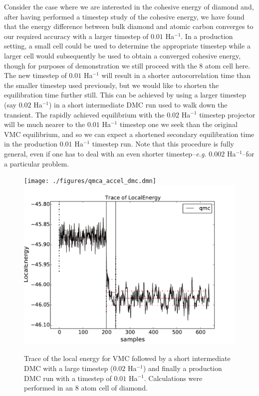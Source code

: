 Consider the case where we are interested in the cohesive energy of 
diamond and, after having performed a timestep study of the cohesive 
energy, we have found that the energy difference between bulk diamond 
and atomic carbon converges to our required accuracy with a larger 
timestep of $0.01$ Ha$^{-1}$.  In a production setting, a small cell 
could be used to determine  the appropriate timestep while a larger 
cell would subsequently be used to obtain a converged cohesive energy, 
though for purposes of demonstration we still proceed with the 8 atom 
cell here.  The new timestep of $0.01$ Ha$^{-1}$ will result in a shorter 
autocorrelation time than the smaller timestep used previously, but 
we would like to shorten the equilibration time further still.  This 
can be achieved by using a larger timestep (say $0.02$ Ha$^{-1}$) in a 
short intermediate DMC run used to walk down the transient.  The 
rapidly achieved equilibrium with the $0.02$ Ha$^{-1}$ timestep 
projector will be much nearer to the $0.01$ Ha$^{-1}$ timestep one 
we seek than the original VMC equilibrium, and so we can expect 
a shortened secondary equilibration time in the production 
$0.01$ Ha$^{-1}$ timestep run. Note that this procedure is fully 
general, even if one has to deal with an even shorter 
timestep--\emph{e.g.} $0.002$ Ha$^{-1}$--for a particular problem.

\begin{figure}
\begin{center}
\ifdefined\HCode  
\texttt{[image: ./figures/qmca\_accel\_dmc.dmn]}
\else
\includegraphics[trim = 0mm 0mm 0mm 0mm, clip,width=0.75\columnwidth]{./figures/qmca_accel_dmc.pdf}
\fi
\end{center}
\caption{Trace of the local energy for VMC followed by a short intermediate DMC with a large timestep ($0.02$ Ha$^{-1}$) and finally a production DMC run with a timestep of $0.01$ Ha$^{-1}$.  Calculations were performed in an 8 atom cell of diamond.} 
\label{fig:qmca_accel_dmc}
\end{figure}

